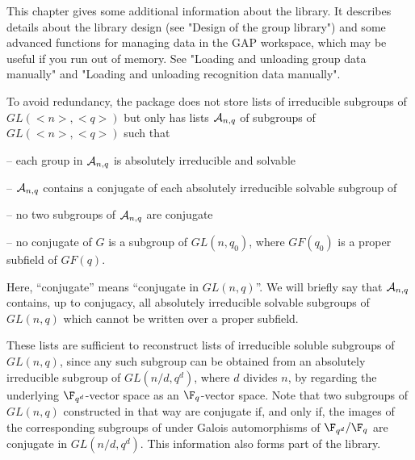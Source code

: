 
This chapter gives some additional information about the {\IRREDSOL} library.
It describes details about the library design (see "Design of the group library")
and some advanced functions for managing data in the GAP workspace, which may be
useful if you run out of memory. See "Loading and unloading group data manually"
and "Loading and unloading recognition data manually".


To avoid redundancy, the package {\IRREDSOL} does not store 
lists of irreducible subgroups of $GL(<n>, <q>)$ but
only has lists ${\cal
A}_{n,q}$ of subgroups of $GL(<n>, <q>)$ such that

\beginlist
\item{--} each group in ${\cal A}_{n,q}$ is absolutely irreducible and
solvable

\item{--} ${\cal A}_{n,q}$ contains a conjugate of each absolutely
irreducible solvable subgroup of

\item{--} no two subgroups of ${\cal A}_{n,q}$ are conjugate

\item{--} no conjugate of $G$ is a subgroup of $GL(n, q_0)$, where
$GF(q_0)$ is a proper subfield of $GF(q)$.

\endlist Here, ``conjugate'' means ``conjugate in $GL(n,q)$''. We will
briefly say that ${\cal A}_{n,q}$ contains, up to conjugacy, all absolutely
irreducible solvable subgroups of $GL(n,q)$ which cannot be written over a
proper subfield.

These lists are sufficient to reconstruct lists of irreducible soluble
subgroups of $GL(n, q)$, since  any such subgroup can be obtained from an
absolutely irreducible subgroup of $GL(n/d, q^d)$, where $d$ divides $n$,
by regarding the underlying $\F_{q^d}$-vector space as an $\F_q$-vector
space. Note that two subgroups of $GL(n, q)$ constructed in that way are
conjugate if, and only if, the images of the corresponding subgroups of
under Galois automorphisms of $\F_{q^d}/\F_q$ are conjugate in $GL(n/d, q^d)$.
This information also forms part of the {\IRREDSOL} library.

